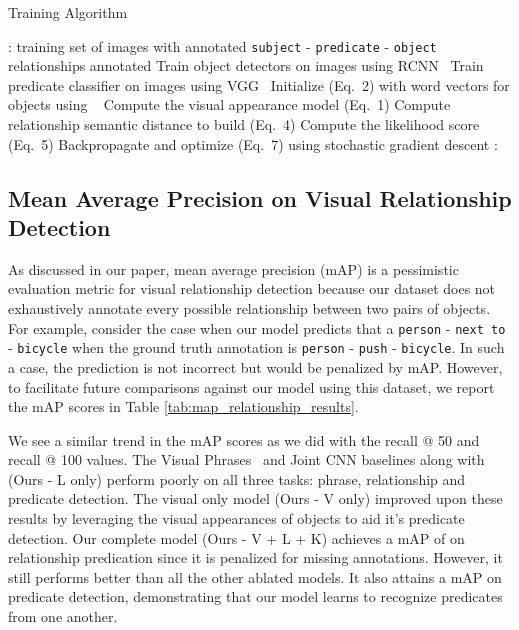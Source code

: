 \documentclass[runningheads]{llncs}
\newcommand{\relationship}[3]{\texttt{#1} - \texttt{#2} - \texttt{#3}}
\begin{document}
\begin{algorithm}[bpt]
\caption{Training Algorithm}
\begin{algorithmic}[1]
: training set of images with annotated \relationship{subject}{predicate}{object} relationships annotated
\STATE Train object detectors on images using RCNN~\cite{girshick14CVPR}
\STATE Train predicate classifier on images using VGG~\cite{simonyan2014very}
\STATE Initialize  (Eq.~2) with word vectors for objects using ~\cite{mikolov2013efficient}
\REPEAT 
    \STATE Compute the visual appearance model  (Eq.~1)
    \STATE Compute relationship semantic distance to build  (Eq.~4)
    \STATE Compute the likelihood score  (Eq.~5)
    \STATE Backpropagate and optimize  (Eq.~7) using stochastic gradient descent
: 
\end{algorithmic}\label{alg:0}
\end{algorithm}

\subsection{Mean Average Precision on Visual Relationship Detection}
As discussed in our paper, mean average precision (mAP) is a pessimistic evaluation metric for visual relationship detection because our dataset does not exhaustively annotate every possible relationship between two pairs of objects. For example, consider the case when our model predicts that a \relationship{person}{next to}{bicycle} when the ground truth annotation is \relationship{person}{push}{bicycle}. In such a case, the prediction is not incorrect but would be penalized by mAP. However, to facilitate future comparisons against our model using this dataset, we report the mAP scores in Table \ref{tab:map_relationship_results}.

We see a similar trend in the mAP scores as we did with the recall @ 50 and recall @ 100 values. The Visual Phrases~\cite{sadeghi2011recognition} and Joint CNN baselines along with (Ours - L only) perform poorly on all three tasks: phrase, relationship and predicate detection. The visual only model (Ours - V only) improved upon these results by leveraging the visual appearances of objects to aid it's predicate detection. Our complete model (Ours - V + L + K) achieves a mAP of  on relationship predication since it is penalized for missing annotations. However, it still performs better than all the other ablated models. It also attains a  mAP on predicate detection, demonstrating that our model learns to recognize predicates from one another.
\end{document}
